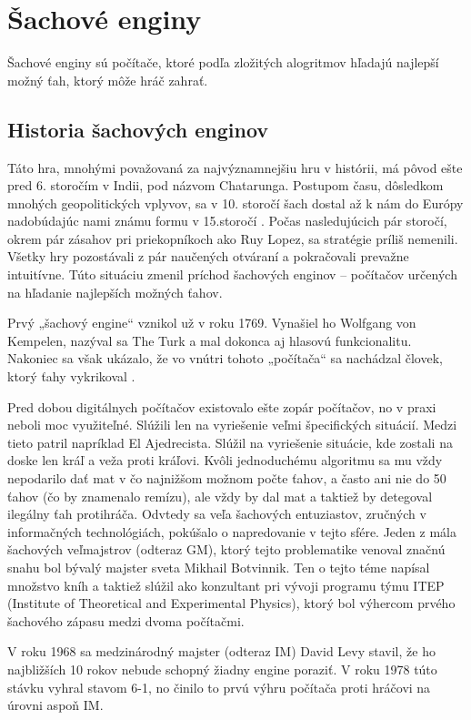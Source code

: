 \documentclass[10pt,twoside,slovak,a4paper]{article}
\begin{document}
\section{Šachové enginy} \label{enginy}
Šachové enginy sú počítače, ktoré podľa zložitých alogritmov hľadajú najlepší možný ťah, ktorý môže hráč zahrať.
\subsection{Historia šachových enginov} \label{enginy:historia}
Táto hra, mnohými považovaná za najvýznamnejšiu hru v histórii, má pôvod ešte pred 6. storočím v Indii, pod názvom Chatarunga. Postupom času, dôsledkom mnohých geopolitických vplyvov, sa v 10. storočí šach dostal až k nám do Európy nadobúdajúc nami známu formu v 15.storočí \cite{History-EB}. Počas nasledujúcich pár storočí, okrem pár zásahov pri priekopníkoch ako Ruy Lopez, sa stratégie príliš nemenili. Všetky hry pozostávali z pár naučených otváraní a pokračovali prevažne intuitívne. Túto situáciu zmenil príchod šachových enginov – počítačov určených na hľadanie najlepších možných ťahov.

Prvý „šachový engine“ vznikol už v roku 1769. Vynašiel ho Wolfgang von Kempelen, nazýval sa The Turk a mal dokonca aj hlasovú funkcionalitu. Nakoniec sa však ukázalo, že vo vnútri tohoto „počítača“ sa nachádzal človek, ktorý ťahy vykrikoval \cite{Levitt:Turk}. 

Pred dobou digitálnych počítačov existovalo ešte zopár počítačov, no v praxi neboli moc využiteľné. Slúžili len na vyriešenie veľmi špecifických situácií. Medzi tieto patril napríklad El Ajedrecista\cite{Williams:HODG}. Slúžil na vyriešenie situácie, kde zostali na doske len kráľ a veža proti kráľovi. Kvôli jednoduchému algoritmu sa mu vždy nepodarilo dať mat v čo najnižšom možnom počte ťahov, a často ani nie do 50 ťahov (čo by znamenalo remízu), ale vždy by dal mat a taktiež by detegoval ilegálny ťah protihráča. Odvtedy sa veľa šachových entuziastov, zručných v informačných technológiách, pokúšalo o napredovanie v tejto sfére. Jeden z mála šachových veľmajstrov (odteraz GM), ktorý tejto problematike venoval značnú snahu bol bývalý majster sveta Mikhail Botvinnik. Ten o tejto téme napísal množstvo kníh a taktiež slúžil ako konzultant pri vývoji programu týmu ITEP (Institute of Theoretical and Experimental Physics), ktorý bol výhercom prvého šachového zápasu medzi dvoma počítačmi. \cite{Botvinnik:CIC} 

V roku 1968 sa medzinárodný majster (odteraz IM) David Levy stavil, že ho najbližších 10 rokov nebude schopný žiadny engine poraziť. V roku 1978 túto stávku vyhral stavom 6-1, no činilo to prvú výhru počítača proti hráčovi na úrovni aspoň IM. \cite{LevyBet}
\end{document}
